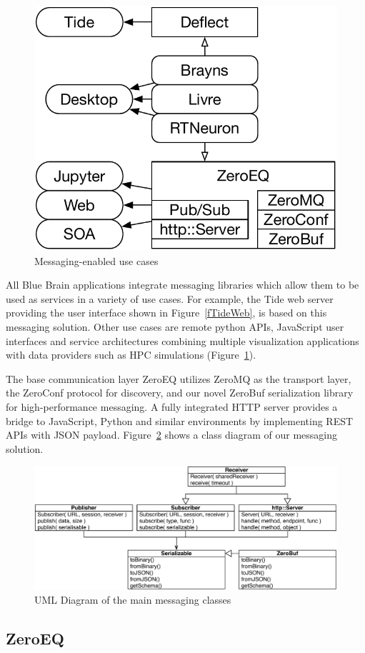\documentclass[10pt]{llncs}
\newcommand{\fig}[1]{Figure~\ref{#1}}
\begin{document}
\begin{figure}\center\vspace{-6ex}
  \includegraphics[width=.382\textwidth]{images/ZeroMS}
  {\caption{\label{fZero}Messaging-enabled use cases}}\vspace{-1em}
\end{figure}

All Blue Brain applications integrate messaging libraries which allow them to be
used as services in a variety of use cases. For example, the Tide web server
providing the user interface shown in \fig{fTideWeb}, is based on this messaging
solution. Other use cases are remote python APIs, JavaScript user interfaces and
service architectures combining multiple visualization applications with data
providers such as HPC simulations (\fig{fZero}).

The base communication layer ZeroEQ utilizes ZeroMQ as the transport layer, the
ZeroConf protocol for discovery, and our novel ZeroBuf serialization library for
high-performance messaging. A fully integrated HTTP server provides a bridge to
JavaScript, Python and similar environments by implementing REST APIs with JSON
payload. \fig{fUML} shows a class diagram of our messaging solution.

\begin{figure}[ht]\center
  \includegraphics[width=\columnwidth]{images/ZeroMSUML}
  \caption{\label{fUML}UML Diagram of the main messaging classes}
\end{figure}

\subsection{ZeroEQ}
\end{document}
